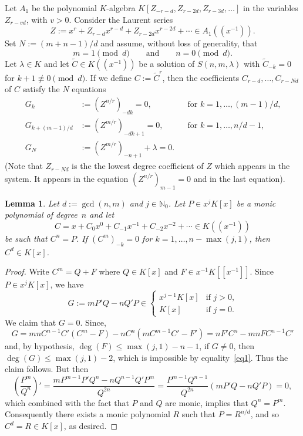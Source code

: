 \documentclass[reqno,a4paper]{amsart}
\newtheorem{lemma}[theorem]{Lemma}
\theoremstyle{definition}
\theoremstyle{remark}
\begin{document}
 Let $A_1$ be the polynomial
$K$-algebra $K[Z_{-r-d},Z_{r-2d},Z_{r-3d},\dots]$ in the variables $Z_{r-vd}$, with $v>0$.
Consider the Laurent series
$$
Z := x^r+Z_{r-d}x^{r-d}+Z_{r-2d}x^{r-2d}+\cdots\in A_1((x^{-1})).
$$
Set $N:=(m+n-1)/d$ and assume, without loss of generality, that
$$
m=1\pmod d\qquad\text{and}\qquad n=0\pmod d.
$$
Let $\lambda\in K$ and let $\tilde C\in K((x^{-1}))$ be a solution of $S(n,m,\lambda)$ with $\tilde C_{-k}=0$ for $k+1\not\equiv 0 \pmod d$. If we define $C:=\tilde C^r$, then the coefficients $C_{r-d},\dots,C_{r-Nd}$ of $C$ satisfy the $N$ equations
\begin{equation}
\begin{aligned}
G_k& :=(Z^{n/r})_{-dk} = 0, && \text{for $k=1,\dots, (m-1)/d$,}\\
%
G_{k+(m-1)/d} & :=(Z^{m/r})_{-dk+1} = 0, &&\text{for $k=1,\dots,n/d-1$,}\\
%
G_N & :=(Z^{m/r})_{-n+1} + \lambda = 0.
\end{aligned}\label{sistema de ecuaciones modificado}
\end{equation}
(Note that $Z_{r-Nd}$ is the the lowest degree coefficient of $Z$ which appears
in the system. It appears in the equation $(Z^{n/r})_{m-1}=0$ and in the last equation).

\begin{lemma}\label{casocero} Let $d:=\gcd(n,m)$ and $j\in \mathds{N}_0$. Let $P\in x^j K[x]$ be a monic
polynomial of degree~$n$ and let
$$
C = x + C_0 x^0 +  C_{-1} x^{-1} +  C_{-2} x^{-2} + \cdots \in K((x^{-1}))
$$
be such that $C^n = P$. If $(C^m)_{-k}=0$ for $k=1,\dots,n-\max(j,1)$, then $C^d\in K[x]$.
\end{lemma}

\begin{proof} Write $C^m=Q+F$ where $Q\in K[x]$ and $F\in x^{-1}K[[x^{-1}]]$. Since $P\in x^j K[x]$, we have
\begin{equation}\label{eq1}
G := mP'Q-nQ'P\in \begin{cases} x^{j-1}K[x] &\text{if $j>0$,}\\ K[x] &\text{if $j=0$.}\end{cases}
\end{equation}
We claim that $G=0$. Since,
$$
G = m n C^{n-1}C'(C^m-F)-n C^n (m C^{m-1}C'-F')= n F' C^n - mnFC^{n-1}C'
$$
and, by hypothesis, $\deg(F)\le \max(j,1)-n-1$, if $G\ne 0$, then $\deg(G) \le \max(j,1)-2$, which is
impossible by equality~\eqref{eq1}. Thus the claim follows. But then
$$
\left(\frac{P^m}{Q^n}\right)'=\frac{mP^{m-1}P'Q^n-nQ^{n-1}Q' P^m}{Q^{2n}} =\frac{P^{m-1}Q^{n-1}}{Q^{2n}}(mP' Q-nQ'P)=0,
$$
which combined with the fact that $P$ and $Q$ are monic, implies that $Q^n = P^m$. Consequently there exists a monic
polynomial $R$ such that $P = R^{n/d}$, and so $C^d = R \in K[x]$, as desired.
\end{proof}
\end{document}
